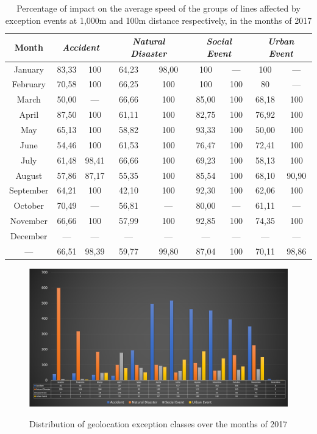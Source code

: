 \documentclass[runningheads]{llncs}
\begin{document}
\begin{table}[!htb]
\centering
\caption {Percentage of impact on the average speed of the groups of lines affected by exception events at 1,000m and 100m distance respectively, in the months of 2017}
\label {tab:exceptEventVelocityImpAll}
\begin{tabular}{c|cc|cc|cc|cc}
\toprule
\textbf{Month} & \multicolumn{2}{c}{\textit{\textbf{Accident}}} & \multicolumn{2}{c}{\textit{\textbf{Natural Disaster}}} & \multicolumn{2}{c}{\textit{\textbf{Social Event}}} &
\multicolumn{2}{c}{\textit{\textbf{Urban Event}}}\\
\midrule
January & 83,33 &  100 & 
64,23 &  98,00 & 
100 & --- &
 100 & --- \\
\hline
February & 70,58 &  100 &
 66,25 &  100 &
 100 & 100 &
 80 & --- \\
\hline
March &  50,00 &  --- & 
66,66 &  100 &
85,00 & 100 &
68,18 & 100 \\
\hline
April & 87,50 &100 & 
 61,11 & 100 & 
 82,75 & 100 & 
 76,92 &  100 \\
\hline
May & 65,13 &  100 &
 58,82 &  100 &
 93,33 & 100 &
 50,00 & 100 \\
\hline
June & 54,46 &  100 &
 61,53 &  100 &
 76,47 & 100 &
 72,41 & 100 \\
\hline
July & 61,48 &  98,41 &
 66,66 & 100 &
 69,23 & 100 &
58,13 & 100 \\
\hline
August & 57,86 & 87,17 &
 55,35 & 100 &
 85,54 & 100 & 
 68,10 & 90,90 \\
\hline
September & 64,21 & 100 &
 42,10 & 100 &
 92,30 & 100 & 
 62,06 & 100 \\
\hline
October & 70,49 & --- &
 56,81 & --- &
 80,00 & --- &
 61,11 & --- \\
\hline
November & 66,66 & 100 &
 57,99 & 100 &
 92,85 & 100 &
 74,35 & 100 \\
\hline
December & --- & --- & --- & --- & --- & --- & --- & ---  \\
\midrule
{---} & 66,51 & 98,39 & 59,77 & 99,80 & 87,04 & 100 & 70,11 & 98,86  \\
\bottomrule
\end{tabular}
\end{table}

\begin{figure}[!htb]
	\centering
 	  \caption{Distribution of geolocation exception classes over the months of 2017}
		\includegraphics[width=0.85\linewidth]{exception_events_classification_distribution.png}
	\label{fig:exception_events_classification_distribution}
\end{figure}
\end{document}
